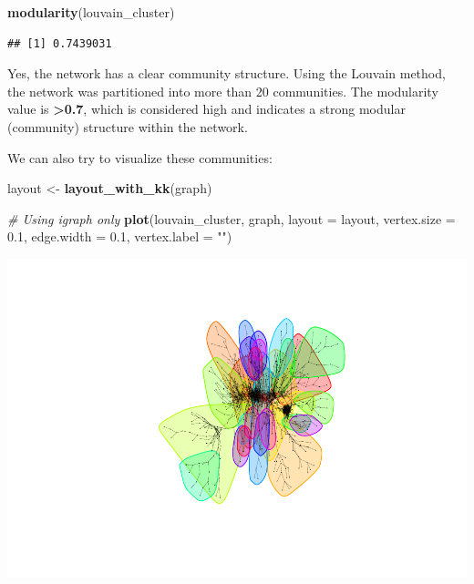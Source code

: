 \documentclass[
]{article}
\newenvironment{Shaded}{\begin{snugshade}}{\end{snugshade}}
\newcommand{\AttributeTok}[1]{\textcolor[rgb]{0.13,0.29,0.53}{#1}}
\newcommand{\CommentTok}[1]{\textcolor[rgb]{0.56,0.35,0.01}{\textit{#1}}}
\newcommand{\FloatTok}[1]{\textcolor[rgb]{0.00,0.00,0.81}{#1}}
\newcommand{\FunctionTok}[1]{\textcolor[rgb]{0.13,0.29,0.53}{\textbf{#1}}}
\newcommand{\NormalTok}[1]{#1}
\newcommand{\OtherTok}[1]{\textcolor[rgb]{0.56,0.35,0.01}{#1}}
\newcommand{\StringTok}[1]{\textcolor[rgb]{0.31,0.60,0.02}{#1}}
\begin{document}
\begin{Shaded}
\begin{Highlighting}[]
\FunctionTok{modularity}\NormalTok{(louvain\_cluster)}
\end{Highlighting}
\end{Shaded}

\begin{verbatim}
## [1] 0.7439031
\end{verbatim}

Yes, the network has a clear community structure. Using the Louvain
method, the network was partitioned into more than 20 communities. The
modularity value is \textbf{\textgreater0.7}, which is considered high
and indicates a strong modular (community) structure within the network.

We can also try to visualize these communities:

\begin{Shaded}
\begin{Highlighting}[]
\NormalTok{layout }\OtherTok{\textless{}{-}} \FunctionTok{layout\_with\_kk}\NormalTok{(graph)}

\CommentTok{\# Using igraph only}
\FunctionTok{plot}\NormalTok{(louvain\_cluster, graph,}
     \AttributeTok{layout =}\NormalTok{ layout,}
     \AttributeTok{vertex.size =} \FloatTok{0.1}\NormalTok{,}
     \AttributeTok{edge.width =} \FloatTok{0.1}\NormalTok{,}
     \AttributeTok{vertex.label =} \StringTok{""}\NormalTok{)}
\end{Highlighting}
\end{Shaded}

\includegraphics{export-network_files/figure-latex/unnamed-chunk-15-1.pdf}
\end{document}
